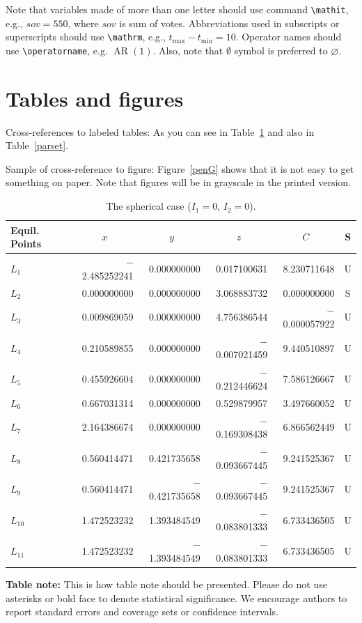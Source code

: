 \documentclass[qe,nameyear,draft]{econsocart}
\theoremstyle{plain}
\begin{document}
Note that variables made of more than one letter should use command \texttt{{\textbackslash}mathit},
e.g., $\mathit{sov}=550$, where $\mathit{sov}$ is sum of votes. Abbreviations used in subscripts or superscripts should use \texttt{{\textbackslash}mathrm},
e.g., $t_{\mathrm{max}} -t_{\mathrm{min}} =10$. Operator names should use \texttt{{\textbackslash}operatorname}, e.g. $\operatorname{AR}(1)$. Also, note that $\emptyset$ symbol is preferred to $\varnothing$.

\section{Tables and figures}

Cross-references to labeled tables: As you can see in Table~\ref{sphericcase}
and also in Table~\ref{parset}.

Sample of cross-reference to figure: Figure~\ref{penG} shows that it is not easy to get something on paper. Note that figures will be in grayscale in the printed version.


\begin{table}
\caption{The spherical case ($I_1=0$, $I_2=0$).}
\label{sphericcase}
\begin{tabular}{@{}lrrrrc@{}@{}}
\hline
Equil. Points
& \multicolumn{1}{c}{$x$}
& \multicolumn{1}{c}{$y$}
& \multicolumn{1}{c}{$z$}
& \multicolumn{1}{c}{$C$}
& S \\
\hline
$L_1$    & $-$2.485252241 & 0.000000000    & 0.017100631    & 8.230711648    & U \\
$L_2$    & 0.000000000    & 0.000000000    & 3.068883732    & 0.000000000    & S \\
$L_3$    & 0.009869059    & 0.000000000    & 4.756386544    & $-$0.000057922 & U \\
$L_4$    & 0.210589855    & 0.000000000    & $-$0.007021459 & 9.440510897    & U \\
$L_5$    & 0.455926604    & 0.000000000    & $-$0.212446624 & 7.586126667    & U \\
$L_6$    & 0.667031314    & 0.000000000    & 0.529879957    & 3.497660052    & U \\
$L_7$    & 2.164386674    & 0.000000000    & $-$0.169308438 & 6.866562449    & U \\
$L_8$    & 0.560414471    & 0.421735658    & $-$0.093667445 & 9.241525367    & U \\
$L_9$    & 0.560414471    & $-$0.421735658 & $-$0.093667445 & 9.241525367    & U \\
$L_{10}$ & 1.472523232    & 1.393484549    & $-$0.083801333 & 6.733436505    & U \\
$L_{11}$ & 1.472523232    & $-$1.393484549 & $-$0.083801333 & 6.733436505    & U \\
\hline
\end{tabular}
\end{table}
\textbf{Table note:} This is how table note should be presented.
Please do not use asterisks or bold face to denote statistical significance.
We encourage authors to report standard errors and coverage sets or confidence intervals.
\end{document}
